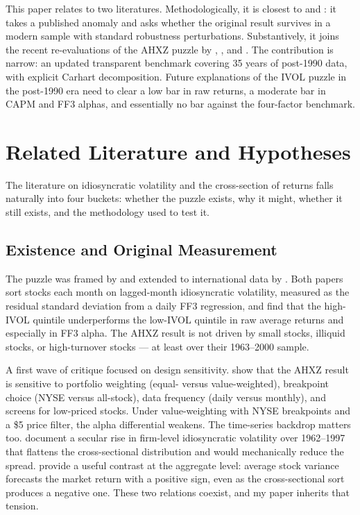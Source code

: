 \documentclass[12pt]{article}
\newcommand{\1}[1]{\mathds{1}\left[#1\right]}
\begin{document}
This paper relates to two literatures. Methodologically, it is closest to
\citet{hou2016have} and \citet{hou2020replicating}: it takes a published anomaly
and asks whether the original result survives in a modern sample with standard
robustness perturbations. Substantively, it joins the recent re-evaluations of
the AHXZ puzzle by \citet{stambaugh2015arbitrage}, \citet{liu2018absolving}, and
\citet{asness2020betting}. The contribution is narrow: an updated transparent
benchmark covering 35 years of post-1990 data, with explicit Carhart
decomposition. Future explanations of the IVOL puzzle in the post-1990 era
need to clear a low bar in raw returns, a moderate bar in CAPM and FF3 alphas,
and essentially no bar against the four-factor benchmark.

\section{Related Literature and Hypotheses}\label{sec:literature}

The literature on idiosyncratic volatility and the cross-section of returns
falls naturally into four buckets: whether the puzzle exists, why it might,
whether it still exists, and the methodology used to test it.

\subsection{Existence and Original Measurement}

The puzzle was framed by \citet{ang2006cross} and extended to international
data by \citet{ang2009high}. Both papers sort stocks each month on
lagged-month idiosyncratic volatility, measured as the residual standard
deviation from a daily FF3 regression, and find that the high-IVOL quintile
underperforms the low-IVOL quintile in raw average returns and especially in
FF3 alpha. The AHXZ result is not driven by small stocks, illiquid stocks, or
high-turnover stocks --- at least over their 1963--2000 sample.

A first wave of critique focused on design sensitivity.
\citet{bali2008idiosyncratic} show that the AHXZ result is sensitive to
portfolio weighting (equal- versus value-weighted), breakpoint choice (NYSE
versus all-stock), data frequency (daily versus monthly), and screens for
low-priced stocks. Under value-weighting with NYSE breakpoints and a
\$5 price filter, the alpha differential weakens. The time-series backdrop
matters too. \citet{campbell2001have} document a secular rise in firm-level
idiosyncratic volatility over 1962--1997 that flattens the cross-sectional
distribution and would mechanically reduce the spread.
\citet{goyal2003idiosyncratic} provide a useful contrast at the aggregate
level: average stock variance forecasts the market return with a positive
sign, even as the cross-sectional sort produces a negative one. These two
relations coexist, and my paper inherits that tension.
\end{document}

